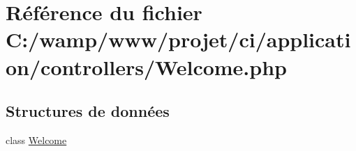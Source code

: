\hypertarget{_welcome_8php}{}\section{Référence du fichier C\+:/wamp/www/projet/ci/application/controllers/\+Welcome.php}
\label{_welcome_8php}
\subsection*{Structures de données}
\begin{DoxyCompactItemize}
\item 
class \mbox{\hyperlink{class_welcome}{Welcome}}
\end{DoxyCompactItemize}
